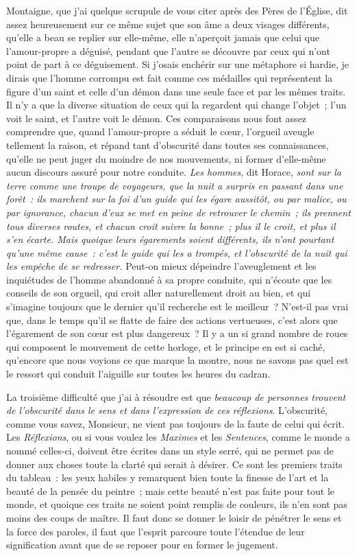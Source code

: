 \documentclass[french,twoside]{book} %
\begin{document}
\noindent Montaigne, que j’ai quelque scrupule de vous citer après des Pères de l’Église, dit assez heureusement sur ce même sujet que son âme a deux visages différents, qu’elle a beau se replier sur elle-même, elle n’aperçoit jamais que celui que l’amour-propre a déguisé, pendant que l’autre se découvre par ceux qui n’ont point de part à ce déguisement. Si j’osais enchérir sur une métaphore si hardie, je dirais que l’homme corrompu est fait comme ces médailles qui représentent la figure d’un saint et celle d’un démon dans une seule face et par les mêmes traits. Il n’y a que la diverse situation de ceux qui la regardent qui change l’objet ; l’un voit le saint, et l’autre voit le démon. Ces comparaisons nous font assez comprendre que, quand l’amour-propre a séduit le cœur, l’orgueil aveugle tellement la raison, et répand tant d’obscurité dans toutes ses connaissances, qu’elle ne peut juger du moindre de nos mouvements, ni former d’elle-même aucun discours assuré pour notre conduite. {\itshape Les hommes}, dit Horace, {\itshape sont sur la terre comme une troupe de voyageurs, que la nuit a surpris en passant dans une forêt : ils marchent sur la foi d’un guide qui les égare aussitôt, ou par malice, ou par ignorance, chacun d’eux se met en peine de retrouver le chemin ; ils prennent tous diverses routes, et chacun croit suivre la bonne ; plus il le croit, et plus il s’en écarte. Mais quoique leurs égarements soient différents, ils n’ont pourtant qu’une même cause : c’est le guide qui les a trompés, et l’obscurité de la nuit qui les empêche de se redresser.} Peut-on mieux dépeindre l’aveuglement et les inquiétudes de l’homme abandonné à sa propre conduite, qui n’écoute que les conseils de son orgueil, qui croit aller naturellement droit au bien, et qui s’imagine toujours que le dernier qu’il recherche est le meilleur ? N’est-il pas vrai que, dans le temps qu’il se flatte de faire des actions vertueuses, c’est alors que l’égarement de son cœur est plus dangereux ? Il y a un si grand nombre de roues qui composent le mouvement de cette horloge, et le principe en est si caché, qu’encore que nous voyions ce que marque la montre, nous ne savons pas quel est le ressort qui conduit l’aiguille sur toutes les heures du cadran.\par
La troisième difficulté que j’ai à résoudre est que {\itshape beaucoup de personnes trouvent de l’obscurité dans le sens et dans l’expression de ces réflexions}. L’obscurité, comme vous savez, Monsieur, ne vient pas toujours de la faute de celui qui écrit. Les {\itshape Réflexions}, ou si vous voulez les {\itshape Maximes} et les {\itshape Sentences}, comme le monde a nommé celles-ci, doivent être écrites dans un style serré, qui ne permet pas de donner aux choses toute la clarté qui serait à désirer. Ce sont les premiers traits du tableau : les yeux habiles y remarquent bien toute la finesse de l’art et la beauté de la pensée du peintre ; mais cette beauté n’est pas faite pour tout le monde, et quoique ces traits ne soient point remplis de couleurs, ils n’en sont pas moins des coups de maître. Il faut donc se donner le loisir de pénétrer le sens et la force des paroles, il faut que l’esprit parcoure toute l’étendue de leur signification avant que de se reposer pour en former le jugement.\par
\end{document}
